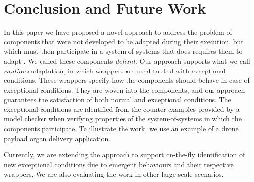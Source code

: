 \section{Conclusion and Future Work}



In this paper we have proposed a novel approach to address the problem of components that were not developed to be adapted during their execution,  but which must then participate in a system-of-systems that does requires them to adapt . We called these components {\it defiant}. Our approach supports what we call  {\it cautious} adaptation, in which wrappers are used to  deal with exceptional conditions. These wrappers specify how the components should behave in case of exceptional conditions. They are woven into the components, and our approach guarantees the satisfaction of both normal and exceptional conditions. The exceptional conditions are identified from the counter examples provided by a model checker when verifying properties of the system-of-systems in which the components participate. To illustrate the work, we use an example of a drone payload organ delivery application.

Currently, we are extending the approach to support on-the-fly identification of new exceptional conditions due to emergent behaviours and their respective wrappers. We are also evaluating the work in other large-scale scenarios.




